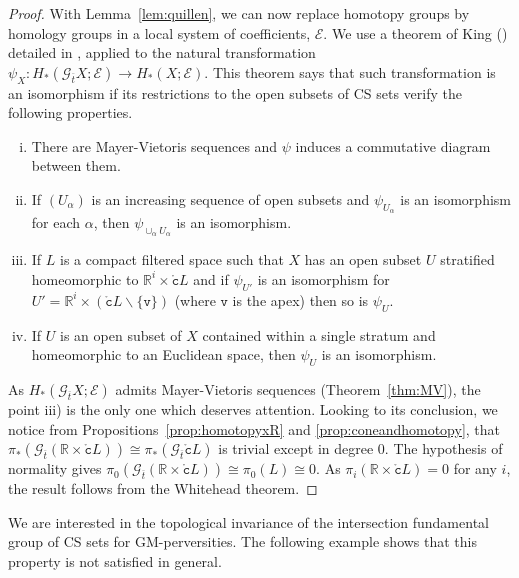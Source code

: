 \documentclass[a4paper,10pt,english,reqno]{amsart}
\theoremstyle{plain}
\theoremstyle{definition}
\theoremstyle{remark}
\numberwithin{equation}{section}
\newcommand{\thmref}[1]{Theorem~\ref{#1}}
\newcommand{\lemref}[1]{Lemma~\ref{#1}}
\def\R{{\mathbb R}}
\def\ov{\overline}
\def\cE{{\mathcal E}}
\def\crG{{\mathscr G}}
\def\tc{{\mathtt c}}
\def\tv{{\mathtt v}}
\def\R{\mathbb{R}}
\def\rc{{\mathring{\tc}}}
\def\menos{\backslash}
\renewcommand\1{\hbox{\ding{192}}}
\renewcommand\2{\hbox{\ding{193}}}
\newcommand\3{\hbox{\ding{194}}}
\newcommand\4{\hbox{\ding{195}}}
\begin{document}
\begin{proof}
%
With \lemref{lem:quillen}, we can now replace homotopy groups by homology groups in a local system of coefficients, $\cE$.
We use a theorem of King (\cite[Section 3]{MR800845}) detailed in \cite[Theorem 5.1]{CST3},
%
applied to the natural transformation
$\psi_{X}\colon H_{*}(\crG_{\ov{t}}X;\cE)\to H_{*}(X;\cE)$. 
This theorem says that such transformation is an isomorphism if
%
%
 its restrictions to the open subsets of CS sets verify the following properties.
\begin{enumerate}[i)]
\item There are Mayer-Vietoris sequences and $\psi$ induces a commutative diagram between them. 
\item If $(U_{\alpha})$ is an increasing sequence of open subsets and $\psi_{U_{\alpha}}$ is an isomorphism 
for each $\alpha$, then $\psi_{\cup_{\alpha} U_{\alpha}}$ is an isomorphism.
\item If $L$ is a compact filtered space such that $X$ has an open subset $U$ stratified homeomorphic to
$\R^i\times \rc L$ and if $\psi_{U'}$ is an isomorphism for $U'=\R^i\times (\rc L\menos \{\tv\})$ (where $\tv$ is the apex)
then so is $\psi_{U}$.
\item If $U$ is an open subset of $X$ contained within a single stratum and homeomorphic to 
an Euclidean space, then $\psi_{U}$ is an isomorphism.
\end{enumerate}
As $H_{*}(\crG_{\ov{t}}X;\cE)$ admits Mayer-Vietoris sequences (\thmref{thm:MV}), 
the point iii) is the only one which deserves attention.
Looking to its conclusion, we notice from Propositions~\ref{prop:homotopyxR} and \ref{prop:coneandhomotopy},
that
$\pi_{*}(\crG_{\ov{t}}(\R\times \rc L))\cong \pi_{*}(\crG_{\ov{t}}\rc L)$
is trivial except in degree 0. The hypothesis of normality gives 
$\pi_{0}(\crG_{\ov{t}}(\R\times \rc L))\cong \pi_{0}(L)\cong 0$. 
As $\pi_{i}(\R\times \rc L)=0$ for any $i$, the result follows from the Whitehead theorem.
%
\end{proof}



We are interested in the topological invariance of the intersection fundamental group of CS sets for GM-perversities.
The following example shows that this property is not satisfied in general.
\end{document}
